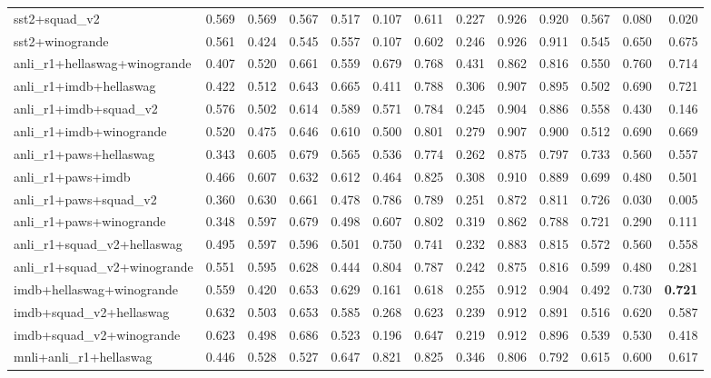 \begin{table}[t]
\begin{tabular}{lrrrrrrrrrrrr}
    sst2+squad\_v2 & 0.569 & 0.569 & 0.567 & 0.517 & 0.107 & 0.611 & 0.227 & 0.926 & 0.920 & 0.567 & 0.080 & 0.020 \\
    sst2+winogrande & 0.561 & 0.424 & 0.545 & 0.557 & 0.107 & 0.602 & 0.246 & 0.926 & 0.911 & 0.545 & 0.650 & 0.675 \\
    \addlinespace
    anli\_r1+hellaswag+winogrande & 0.407 & 0.520 & 0.661 & 0.559 & 0.679 & 0.768 & 0.431 & 0.862 & 0.816 & 0.550 & 0.760 & 0.714 \\
    anli\_r1+imdb+hellaswag & 0.422 & 0.512 & 0.643 & 0.665 & 0.411 & 0.788 & 0.306 & 0.907 & 0.895 & 0.502 & 0.690 & 0.721 \\
    anli\_r1+imdb+squad\_v2 & 0.576 & 0.502 & 0.614 & 0.589 & 0.571 & 0.784 & 0.245 & 0.904 & 0.886 & 0.558 & 0.430 & 0.146 \\
    anli\_r1+imdb+winogrande & 0.520 & 0.475 & 0.646 & 0.610 & 0.500 & 0.801 & 0.279 & 0.907 & 0.900 & 0.512 & 0.690 & 0.669 \\
    anli\_r1+paws+hellaswag & 0.343 & 0.605 & 0.679 & 0.565 & 0.536 & 0.774 & 0.262 & 0.875 & 0.797 & 0.733 & 0.560 & 0.557 \\
    anli\_r1+paws+imdb & 0.466 & 0.607 & 0.632 & 0.612 & 0.464 & 0.825 & 0.308 & 0.910 & 0.889 & 0.699 & 0.480 & 0.501 \\
    anli\_r1+paws+squad\_v2 & 0.360 & 0.630 & 0.661 & 0.478 & 0.786 & 0.789 & 0.251 & 0.872 & 0.811 & 0.726 & 0.030 & 0.005 \\
    anli\_r1+paws+winogrande & 0.348 & 0.597 & 0.679 & 0.498 & 0.607 & 0.802 & 0.319 & 0.862 & 0.788 & 0.721 & 0.290 & 0.111 \\
    anli\_r1+squad\_v2+hellaswag & 0.495 & 0.597 & 0.596 & 0.501 & 0.750 & 0.741 & 0.232 & 0.883 & 0.815 & 0.572 & 0.560 & 0.558 \\
    anli\_r1+squad\_v2+winogrande & 0.551 & 0.595 & 0.628 & 0.444 & 0.804 & 0.787 & 0.242 & 0.875 & 0.816 & 0.599 & 0.480 & 0.281 \\
    imdb+hellaswag+winogrande & 0.559 & 0.420 & 0.653 & 0.629 & 0.161 & 0.618 & 0.255 & 0.912 & 0.904 & 0.492 & 0.730 & \textbf{0.721} \\
    imdb+squad\_v2+hellaswag & 0.632 & 0.503 & 0.653 & 0.585 & 0.268 & 0.623 & 0.239 & 0.912 & 0.891 & 0.516 & 0.620 & 0.587 \\
    imdb+squad\_v2+winogrande & 0.623 & 0.498 & 0.686 & 0.523 & 0.196 & 0.647 & 0.219 & 0.912 & 0.896 & 0.539 & 0.530 & 0.418 \\
    mnli+anli\_r1+hellaswag & 0.446 & 0.528 & 0.527 & 0.647 & 0.821 & 0.825 & 0.346 & 0.806 & 0.792 & 0.615 & 0.600 & 0.617 \\

\end{tabular}
\end{table}
